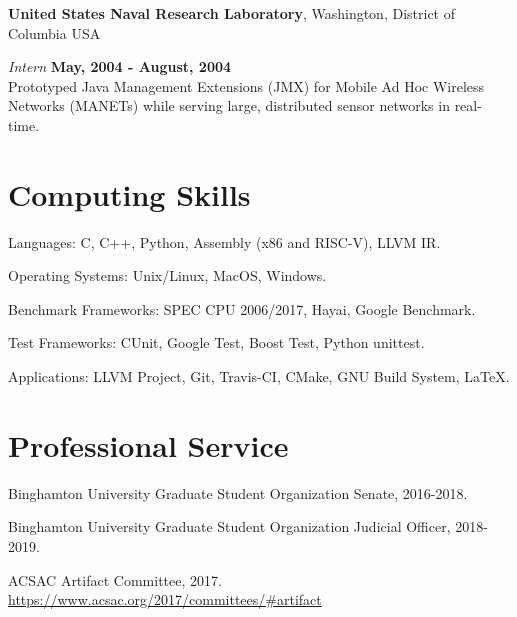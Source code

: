 \documentclass[margin,line]{res}
\begin{document}
\begin{resume}
{\bf United States Naval Research Laboratory}, Washington, District of Columbia USA

\vspace{-.3cm}
{\em Intern} \hfill {\bf May, 2004 - August, 2004}\\
Prototyped Java Management Extensions (JMX) for Mobile Ad Hoc Wireless Networks (MANETs) while serving large, distributed sensor networks in real-time.


\section{\sc Computing Skills} 
\begin{list2}
\item Languages: C, C++, Python, Assembly (x86 and RISC-V), LLVM IR.
\item Operating Systems: Unix/Linux, MacOS, Windows.
\item Benchmark Frameworks: SPEC CPU 2006/2017, Hayai, Google Benchmark.
\item Test Frameworks: CUnit, Google Test, Boost Test, Python unittest.
\item Applications: LLVM Project, Git, Travis-CI, CMake, GNU Build System, \LaTeX.
\end{list2}

\section{\sc Professional Service}
\begin{list2}
\item Binghamton University Graduate Student Organization Senate, 2016-2018.
\item Binghamton University Graduate Student Organization Judicial Officer, 2018-2019.
\item ACSAC Artifact Committee, 2017. \url{https://www.acsac.org/2017/committees/#artifact}
\end{list2}

\end{resume}
\end{document}
